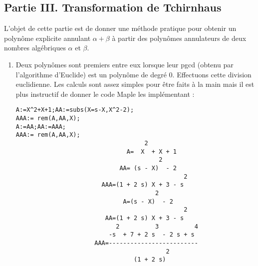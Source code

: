 \subsection*{Partie III. Transformation de Tchirnhaus}
L'objet de cette partie est de donner une méthode pratique pour obtenir un polynôme explicite annulant $\alpha + \beta$ à partir des polynômes annulateurs de deux nombres algébriques $\alpha$ et $\beta$.
\begin{enumerate}
 \item Deux polynômes sont premiers entre eux lorsque leur pgcd (obtenu par l'algorithme d'Euclide) est un polynôme de degré $0$. Effectuons cette division euclidienne.\newline
Les calculs sont assez simples pour être faits à la main mais il est plus instructif de donner le code Maple les implémentant :
\begin{verbatim}
A:=X^2+X+1;AA:=subs(X=s-X,X^2-2);
AAA:= rem(A,AA,X);
A:=AA;AA:=AAA;
AAA:= rem(A,AA,X);
                                    2        
                               A=  X  + X + 1
                                        2    
                             AA= (s - X)  - 2
                                               2
                        AAA=(1 + 2 s) X + 3 - s 
                                       2    
                              A=(s - X)  - 2
                                               2
                         AA=(1 + 2 s) X + 3 - s 
                            2          3          4
                          -s  + 7 + 2 s  - 2 s + s 
                      AAA=-------------------------
                                          2        
                                 (1 + 2 s)         



\end{verbatim}
\end{enumerate}
